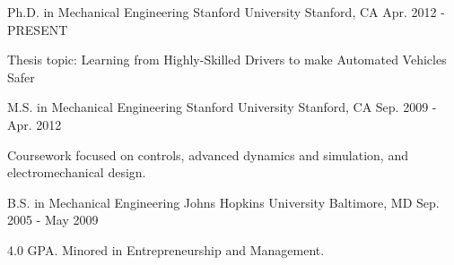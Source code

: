 \begin{cventries}
  \cventry
    {Ph.D. in Mechanical Engineering}
    {Stanford University}
    {Stanford, CA}
    {Apr. 2012 - PRESENT}
    {
      \begin{cvitems}
        \item {Thesis topic: Learning from Highly-Skilled Drivers to make Automated Vehicles Safer}
      \end{cvitems}
    }
  \cventry
    {M.S. in Mechanical Engineering}
    {Stanford University}
    {Stanford, CA}
    {Sep. 2009 - Apr. 2012}
    {
      \begin{cvitems}
        \item {Coursework focused on controls, advanced dynamics and simulation, and electromechanical design.}
      \end{cvitems}
    }
  \cventry
    {B.S. in Mechanical Engineering}
    {Johns Hopkins University}
    {Baltimore, MD}
    {Sep. 2005 - May 2009}
    {
      \begin{cvitems}
        \item {4.0 GPA. Minored in Entrepreneurship and Management.}
      \end{cvitems}
    }
\end{cventries}
